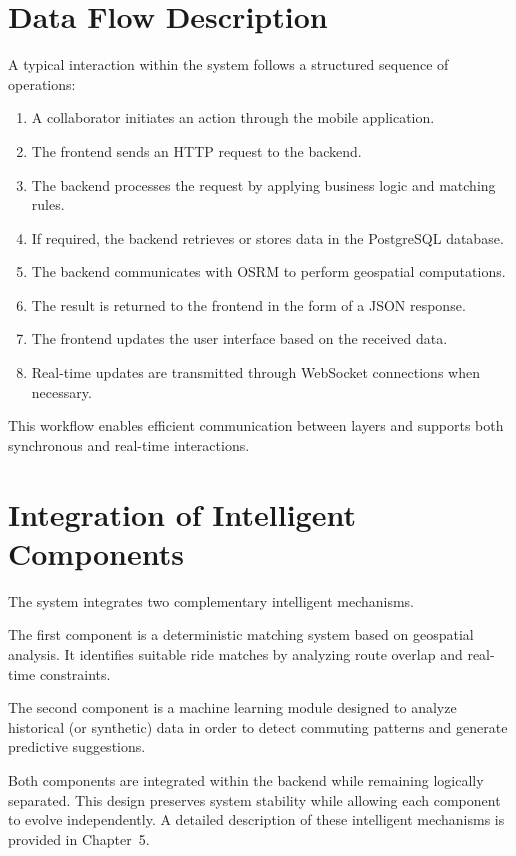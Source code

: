 \section{Data Flow Description}

A typical interaction within the system follows a structured sequence of operations:

\begin{enumerate}
    \item A collaborator initiates an action through the mobile application.
    \item The frontend sends an HTTP request to the backend.
    \item The backend processes the request by applying business logic and matching rules.
    \item If required, the backend retrieves or stores data in the PostgreSQL database.
    \item The backend communicates with OSRM to perform geospatial computations.
    \item The result is returned to the frontend in the form of a JSON response.
    \item The frontend updates the user interface based on the received data.
    \item Real-time updates are transmitted through WebSocket connections when necessary.
\end{enumerate}

This workflow enables efficient communication between layers and supports both synchronous and real-time interactions.

\section{Integration of Intelligent Components}

The system integrates two complementary intelligent mechanisms.

The first component is a deterministic matching system based on geospatial analysis. It identifies suitable ride matches by analyzing route overlap and real-time constraints.

The second component is a machine learning module designed to analyze historical (or synthetic) data in order to detect commuting patterns and generate predictive suggestions.

Both components are integrated within the backend while remaining logically separated. This design preserves system stability while allowing each component to evolve independently. A detailed description of these intelligent mechanisms is provided in Chapter~5.

